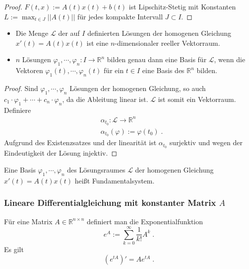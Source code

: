 \begin{proof}
$F(t,x):= A(t) x(t) + b(t)$ ist Lipschitz-Stetig mit Konstanten $L:= \max_{t \in J}|| A(t) ||$ für jedes kompakte Intervall $J \subset I$.
\end{proof}

\begin{Satz}
\label{LHL}
\hfill
\begin{itemize}
\item Die Menge $\mathcal{L}$ der auf $I$ definierten Lösungen der homogenen Gleichung $x'(t) = A(t)x(t)$ ist eine $n$-dimensionaler reeller Vektorraum.
\item $n$ Lösungen $\varphi_1, \cdots, \varphi_n : I \to \mathbb{R}^n$ bilden genau dann eine Basis für $\mathcal{L}$, wenn die Vektoren $\varphi_1(t), \cdots, \varphi_n(t)$ für ein $t \in I$ eine Basis des $\mathbb{R}^n$ bilden.
\end{itemize}
\end{Satz}
\begin{proof}
Sind  $\varphi_1, \cdots, \varphi_n$ Lösungen der homogenen Gleichung, so auch $ c_1 \cdot \varphi_1 + \cdots + c_n \cdot \varphi_n$, da die Ableitung linear ist.
$\mathcal{L}$ ist somit ein Vektorraum. Definiere 
\begin{align*}
& \alpha_{t_0} : \mathcal{L} \to \mathbb{R}^n \\
& \alpha_{t_0} (\varphi) := \varphi(t_0) \; .
\end{align*} 
Aufgrund des Existenzsatzes und der linearität ist $ \alpha_{t_0}$ surjektiv und wegen der Eindeutigkeit der Lösung injektiv.
\end{proof}

\begin{Definition}
Eine Basis  $\varphi_1, \cdots, \varphi_n$ des Lösungsraumes $\mathcal{L}$ der homogenen Gleichung $x'(t) = A(t)x(t)$ heißt Fundamentalsystem.
\end{Definition}

\subsubsection{Lineare Differentialgleichung mit konstanter Matrix $A$}

\begin{Definition}
Für eine Matrix $A \in \mathbb{R}^{n \times n}$ definiert man die Exponentialfunktion 
$$  e^{ A}  := \sum_{k= 0}^{\infty} \frac{1}{k!} A^k \; .$$
Es gilt  
$$  (e^{ tA})' = A e^{tA}  \; .$$
\end{Definition}


